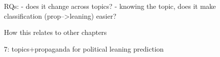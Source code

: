 \label{chap:topics}


RQs:
- does it change across topics?
- knowing the topic, does it make classification (prop-->leaning) easier?

How this relates to other chapters

7: topics+propaganda for political leaning prediction